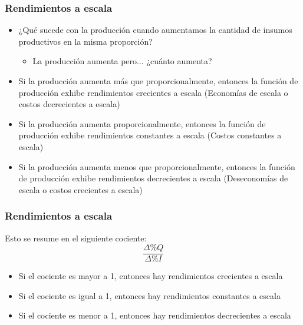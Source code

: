 \documentclass{beamer}
\begin{document}
\begin{frame}
\frametitle{Rendimientos a escala}
\begin{itemize}
    \item ¿Qué sucede con la producción cuando aumentamos la cantidad de insumos productivos en la misma proporción?
    \begin{itemize}
        \item La producción aumenta pero... ¿cuánto aumenta?
    \end{itemize}
    \item Si la producción aumenta más que proporcionalmente, entonces la función de producción exhibe rendimientos crecientes a escala (Economías de escala o costos decrecientes a escala)
    \item Si la producción aumenta proporcionalmente, entonces la función de producción exhibe rendimientos constantes a escala (Costos constantes a escala)
    \item Si la producción aumenta menos que proporcionalmente, entonces la función de producción exhibe rendimientos decrecientes a escala (Deseconomías de escala o costos crecientes a escala)
\end{itemize}
\end{frame}

\begin{frame}
    \frametitle{Rendimientos a escala}
    Esto se resume en el siguiente cociente:
    \[ \frac{\Delta \% Q}{\Delta \% I} \]
    \begin{itemize}
        \item Si el cociente es mayor a 1, entonces hay rendimientos crecientes a escala
        \item Si el cociente es igual a 1, entonces hay rendimientos constantes a escala
        \item Si el cociente es menor a 1, entonces hay rendimientos decrecientes a escala
    \end{itemize}

\end{frame}
\end{document}

